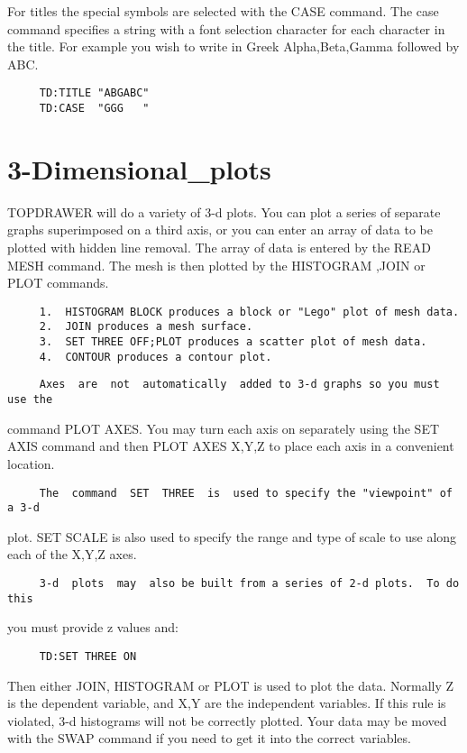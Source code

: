 For  titles  the special symbols are selected with the CASE command.  The
case command specifies a string with a font selection character for  each
character  in  the  title.   For  example  you  wish  to  write  in Greek
Alpha,Beta,Gamma followed by ABC.  
\begin{verbatim}
     TD:TITLE "ABGABC" 
     TD:CASE  "GGG   " 
\end{verbatim}
\section{3-Dimensional\_plots}
TOPDRAWER  will  do  a  variety  of  3-d  plots.   You can plot a series of
separate graphs superimposed on a third axis, or you can enter an array  of
data  to be plotted with hidden line removal.  The array of data is entered
by the READ MESH command.  The mesh is then plotted by the HISTOGRAM  ,JOIN
or PLOT commands.  
\begin{verbatim}
     1.  HISTOGRAM BLOCK produces a block or "Lego" plot of mesh data.  
     2.  JOIN produces a mesh surface.  
     3.  SET THREE OFF;PLOT produces a scatter plot of mesh data.  
     4.  CONTOUR produces a contour plot.  
\end{verbatim}

\begin{verbatim}
     Axes  are  not  automatically  added to 3-d graphs so you must use the
\end{verbatim}
command PLOT AXES.  You may turn each axis on separately using the SET AXIS
command  and  then  PLOT  AXES  X,Y,Z  to  place  each axis in a convenient
location.  

\begin{verbatim}
     The  command  SET  THREE  is  used to specify the "viewpoint" of a 3-d
\end{verbatim}
plot.  SET SCALE is also used to specify the range and type of scale to use
along each of the X,Y,Z axes.  

\begin{verbatim}
     3-d  plots  may  also be built from a series of 2-d plots.  To do this
\end{verbatim}
you must provide z values and:  
\begin{verbatim}
     TD:SET THREE ON 
\end{verbatim}
Then  either  JOIN, HISTOGRAM or PLOT is used to plot the data.  Normally Z
is the dependent variable, and X,Y are the independent variables.  If  this
rule  is violated, 3-d histograms will not be correctly plotted.  Your data
may be moved with the SWAP command if you need to get it into  the  correct
variables.  
